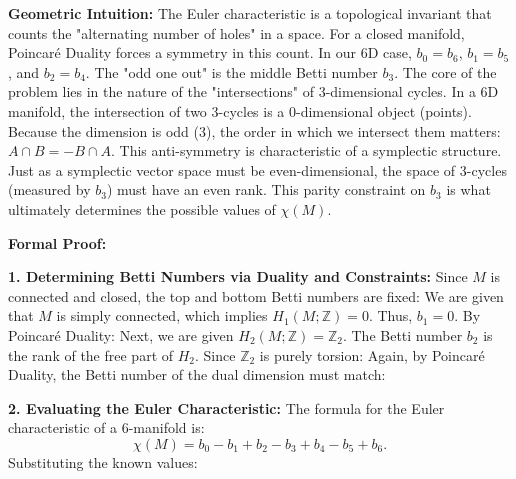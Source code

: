 \begin{solution}
\textbf{Geometric Intuition:}
The Euler characteristic is a topological invariant that counts the "alternating number of holes" in a space. For a closed manifold, Poincaré Duality forces a symmetry in this count. In our 6D case, $b_0=b_6$, $b_1=b_5$, and $b_2=b_4$. The "odd one out" is the middle Betti number $b_3$. 
The core of the problem lies in the nature of the "intersections" of 3-dimensional cycles. In a 6D manifold, the intersection of two 3-cycles is a 0-dimensional object (points). Because the dimension is odd ($3$), the order in which we intersect them matters: $A \cap B = -B \cap A$. This anti-symmetry is characteristic of a symplectic structure. Just as a symplectic vector space must be even-dimensional, the space of 3-cycles (measured by $b_3$) must have an even rank. This parity constraint on $b_3$ is what ultimately determines the possible values of $\chi(M)$.

\textbf{Formal Proof:}

\textbf{1. Determining Betti Numbers via Duality and Constraints:}
Since $M$ is connected and closed, the top and bottom Betti numbers are fixed:
We are given that $M$ is simply connected, which implies $H_1(M; \mathbb{Z}) = 0$. Thus, $b_1 = 0$. By Poincaré Duality:
Next, we are given $H_2(M; \mathbb{Z}) = \mathbb{Z}_2$. The Betti number $b_2$ is the rank of the free part of $H_2$. Since $\mathbb{Z}_2$ is purely torsion:
Again, by Poincaré Duality, the Betti number of the dual dimension must match:

\textbf{2. Evaluating the Euler Characteristic:}
The formula for the Euler characteristic of a 6-manifold is:
\[
\chi(M) = b_0 - b_1 + b_2 - b_3 + b_4 - b_5 + b_6.
\]
Substituting the known values:


\end{solution}
